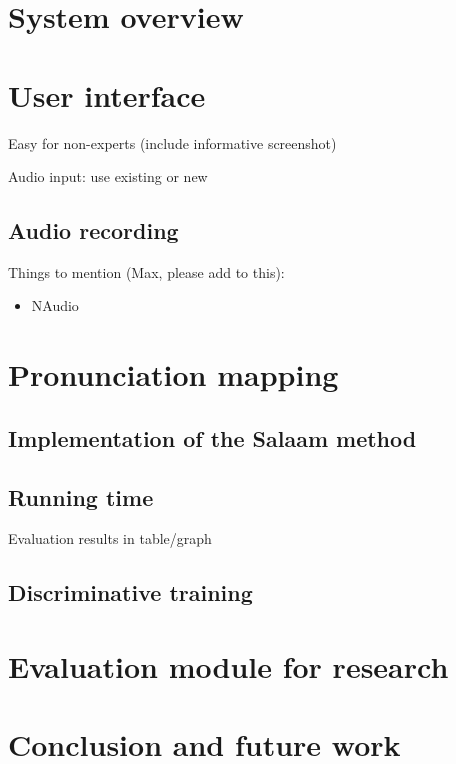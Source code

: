 \documentclass[11pt]{article}
\begin{document}
\section{System overview}
\label{sec:overview}


\section{User interface}
\label{sec:frontend}
Easy for non-experts (include informative screenshot)

Audio input: use existing or new

\subsection{Audio recording}
\label{sec:recording}

Things to mention (Max, please add to this):
\begin{itemize}
\item{NAudio}
\end{itemize}



\section{Pronunciation mapping}
\label{sec:backend}

\subsection{Implementation of the Salaam method}
\label{sec:implementation}
\cite{Qiao10}

\subsection{Running time}
\label{sec:runningtime}
Evaluation results in table/graph

\subsection{Discriminative training}
\label{sec:discrimtrain}
\cite{Chan12}


\section{Evaluation module for research}
\label{sec:evaluation}

\section{Conclusion and future work}
\label{sec:future}




%

%
%


\end{document}
